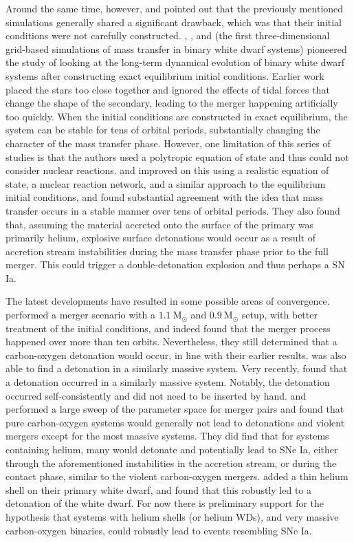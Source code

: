 \documentclass[iop]{../emulateapj}
\newcommand{\msolar}{\mathrm{M}_\odot}
\begin{document}
Around the same time, however, \cite{guillochon:2010} and
\cite{dan:2011} pointed out that the previously mentioned simulations 
generally shared a significant drawback, which was that their initial conditions
were not carefully constructed. \cite{motl:2002}, \cite{dsouza:2006},
and \cite{motl:2007} (the first three-dimensional grid-based
simulations of mass transfer in binary white dwarf systems) pioneered
the study of looking at the long-term dynamical evolution of binary
white dwarf systems after constructing exact equilibrium initial
conditions. Earlier work placed the stars too close together 
and ignored the effects of tidal forces that change the shape of the 
secondary, leading to the merger
happening artificially too quickly. When the initial conditions are
constructed in exact equilibrium, the system can be stable for tens of
orbital periods, substantially changing the character of the mass
transfer phase. However, one limitation of this series of studies is
that the authors used a polytropic equation of state and thus could
not consider nuclear reactions. \cite{guillochon:2010} and
\cite{dan:2011} improved on this using a realistic equation of state,
a nuclear reaction network, and a similar approach to the equilibrium
initial conditions, and found substantial agreement with the idea that
mass transfer occurs in a stable manner over tens of orbital
periods. They also found that, assuming the material accreted onto the
surface of the primary was primarily helium, explosive surface
detonations would occur as a result of accretion stream instabilities
during the mass transfer phase prior to the full merger. This could
trigger a double-detonation explosion and thus perhaps a SN Ia.

The latest developments have resulted in some possible areas of convergence.
\cite{pakmor:2012} performed a merger scenario
with a $1.1\ \msolar$ and $0.9\ \msolar$ setup, with better treatment
of the initial conditions, and indeed found that the merger process
happened over more than ten orbits. Nevertheless, they still determined
that a carbon-oxygen detonation would occur, in line with their
earlier results. \cite{moll:2014} was also able to find a detonation
in a similarly massive system. Very recently, \cite{kashyap:2015} 
found that a detonation occurred in a similarly massive system. Notably,
the detonation occurred self-consistently and did not need to be inserted 
by hand. \cite{dan:2012} and \cite{dan:2014} performed a large sweep 
of the parameter space for merger pairs and
found that pure carbon-oxygen systems would generally not lead to
detonations and violent mergers except for the most massive
systems. They did find that for systems containing helium, many
would detonate and potentially lead to SNe Ia, either through the
aforementioned instabilities in the accretion stream, or during the
contact phase, similar to the violent carbon-oxygen
mergers. \cite{pakmor:2013} added a thin helium shell on their primary
white dwarf, and found that this robustly led to a detonation of the
white dwarf. For now there is preliminary support for the hypothesis
that systems with helium shells (or helium WDs), and very massive carbon-oxygen binaries,
could robustly lead to events resembling SNe Ia.
\end{document}
